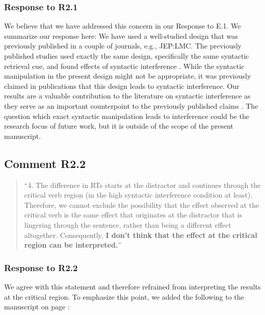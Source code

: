 \documentclass[12pt]{article}
\begin{document}
\subsubsection*{Response to R2.1}
We believe that we have addressed this concern in our Response to E.1. We summarize our response here: We have used a well-studied design that was previously published in a couple of journals, e.g., JEP:LMC. The previously published studies used exactly the same design, specifically the same syntactic retrieval cue, and found effects of syntactic interference \citep{vandyke07,mertzen}. While the syntactic manipulation in the present design might not be appropriate, it was previously claimed in publications that this design leads to syntactic interference. Our results are a valuable contribution to the literature on syntactic interference as they serve as an important counterpoint to the previously published claims \citep{vandyke07, mertzen}. The question which exact syntactic manipulation leads to interference could be the research focus of future work, but it is outside of the scope of the present manuscript. 


\subsection*{Comment R2.2}
\begin{quote}
``4. The difference in RTs starts at the distractor and continues through the critical verb region (in the high syntactic interference condition at least). Therefore, we cannot exclude the possibility that the effect observed at the critical verb is the same effect that originates at the distractor that is lingering through the sentence, rather than being a different effect altogether. Consequently, \textbf{I don't think that the effect at the critical region can be interpreted.}''
\end{quote}

\subsubsection*{Response to R2.2}
We agree with this statement and therefore refrained from interpreting the results at the critical region. To emphasize this point, we added the following to the manuscript on page \pageref{only_precritical}:\\

\begin{quote}
\end{quote}
\end{document}
